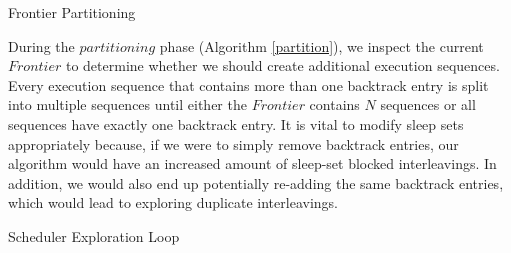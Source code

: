 \begin{algorithm}
    \caption{Frontier Partitioning}
    \label{partition}
\end{algorithm}

During the $partitioning$ phase (Algorithm \ref{partition}), we inspect the current $Frontier$ to determine whether
we should create additional execution sequences. Every execution sequence that contains more than one backtrack entry
is split into multiple sequences until either the $Frontier$ contains $N$ sequences or all sequences
have exactly one backtrack entry. It is vital to modify sleep sets appropriately because, if we were to simply
remove backtrack entries, our algorithm would have an increased amount of sleep-set blocked interleavings. In addition, we would also 
end up potentially re-adding the same backtrack entries, which would lead
to exploring duplicate interleavings.

\begin{algorithm}
    \caption{Scheduler Exploration Loop}
    \label{explore_loop}
\end{algorithm}

